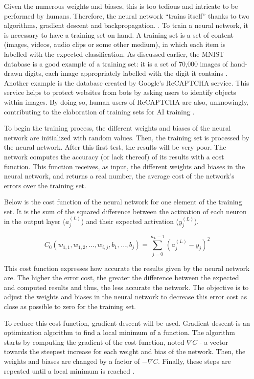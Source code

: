 ﻿\documentclass[12pt,a4paper,notitlepage]{article}
\begin{document}
Given the numerous weights and biases, this is too tedious and intricate to be performed by humans. Therefore, the neural network “trains itself” thanks to two algorithms, gradient descent and backpropagation. \cite{ibm_cloud_education_what_2020}.
To train a neural network, it is necessary to have a training set on hand. A training set is a set of content (images, videos, audio clips or some other medium), in which each item is labelled with the expected classification. As discussed earlier, the MNIST database is a good example of a training set: it is a set of 70,000 images of hand-drawn digits, each image appropriately labelled with the digit it contains \cite{lecun_mnist_1998}. Another example is the database created by Google's ReCAPTCHA service. This service helps to protect websites from bots by asking users to identify objects within images. By doing so, human users of ReCAPTCHA are also, unknowingly, contributing to the elaboration of training sets for AI training \cite{maruzani_are_2021}.

To begin the training process, the different weights and biases of the neural network are initialized with random values. Then, the training set is processed by the neural network. After this first test, the results will be very poor. The network computes the accuracy (or lack thereof) of its results with a cost function. This function receives, as input, the different weights and biases in the neural network, and returns a real number, the average cost of the network's errors over the training set.

Below is the cost function of the neural network for one element of the training set. It is the sum of the squared difference between the activation of each neuron in the output layer (\(a_{j}^{(L)}\)) and their expected activation (\(y_{j}^{(L)}\)).

\begin{displaymath}
 C_{0}(w_{1,1}, w_{1,2}, ..., w_{i,j}, b_{1}, ... ,b_{j}) = \sum_{j=0}^{n_{L} - 1} (a_{j}^{(L)} - y_{j})^{2}
\end{displaymath}

This cost function expresses how accurate the results given by the neural network are. The higher the error cost, the greater the difference between the expected and computed results and thus, the less accurate the network. The objective is to adjust the weights and biases in the neural network to decrease this error cost as close as possible to zero for the training set.

To reduce this cost function, gradient descent will be used. Gradient descent is an optimization algorithm to find a local minimum of a function. The algorithm starts by computing the gradient of the cost function, noted \(\nabla C\) - a vector towards the steepest increase for each weight and bias of the network. Then, the weights and biases are changed by a factor of \(-\nabla C\). Finally, these steps are repeated until a local minimum is reached \cite{sanderson_gradient_2017}.
\end{document}
